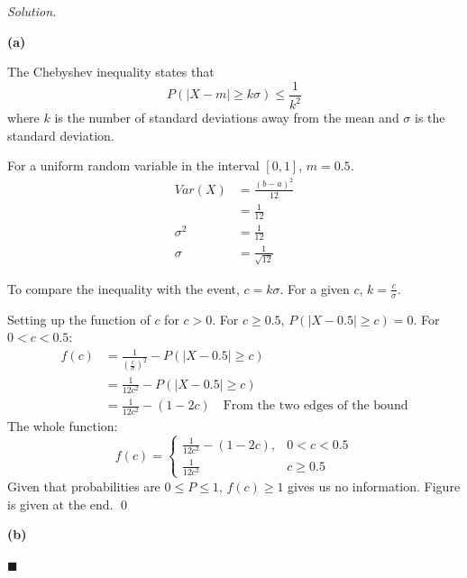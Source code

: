 \documentclass[11pt]{article}
\newenvironment{solution}
{\par\medskip\noindent\textit{Solution.}\ }
{\hfill$\blacksquare$\par\medskip}
\begin{document}
    \begin{solution}

        \textbf{(a)}

        The Chebyshev inequality states that
        \[
            P(|X - m| \ge k\sigma) \leq \frac{1}{k^2}
        \]
        where $k$ is the number of standard deviations away from the mean and $\sigma$ is the standard deviation.

        For a uniform random variable in the interval $[0, 1]$, $m = 0.5$.
        \begin{align*}
            Var(X) &= \frac{(b - a)^2}{12} \\
            &= \frac{1}{12} \\
            \sigma^2 &= \frac{1}{12} \\
            \sigma &= \frac{1}{\sqrt{12}}
        \end{align*}

        To compare the inequality with the event, $c = k\sigma$.
        For a given $c$, $k = \frac{c}{\sigma}$.

        Setting up the function of $c$ for $c > 0$.
        For $c \ge 0.5$, $P(|X - 0.5| \ge c) = 0$.
        For $0 < c < 0.5$:
        \begin{align*}
            f(c) &= \frac{1}{\left(\frac{c}{\sigma}\right)^2} - P(|X - 0.5| \ge c) \\
            &= \frac{1}{12c^2} - P(|X - 0.5| \ge c) \\
            &= \frac{1}{12c^2} - (1 - 2c) \quad \text{From the two edges of the bound}
        \end{align*}
        The whole function:
        \[
            f(c) = \begin{cases}
                       \frac{1}{12c^2} - (1 - 2c), & 0 < c < 0.5 \\
                       \frac{1}{12c^2} & c \geq 0.5
            \end{cases}
        \]
        Given that probabilities are $0 \leq P \leq 1$, $f(c) \geq 1$ gives us no information.
        Figure is given at the end.
        \qed

        \vspace{1em}
        \textbf{(b)}


\end{solution}
\end{document}
